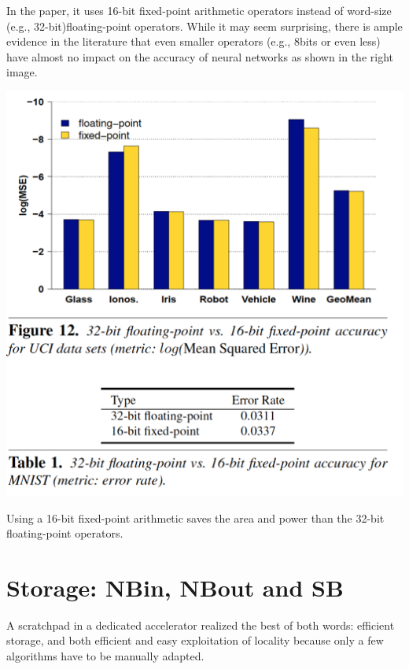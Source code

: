 \documentclass[10pt]{article}
\begin{document}
\begin{itemize}
        In the paper, it uses 16-bit fixed-point arithmetic
        operators instead of word-size (e.g., 32-bit)floating-point
        operators. While it may seem surprising, there is ample
        evidence in the literature that even smaller operators
        (e.g., 8bits or even less) have almost no impact on the 
        accuracy of neural networks as shown in the right image.
        \begin{marginfigure}
            \includegraphics[width=\marginparwidth]{arithmetic.png}
        \end{marginfigure}

        Using a 16-bit fixed-point arithmetic saves the area and
        power than the 32-bit floating-point operators.
    \end{itemize}
    \section{Storage: NBin, NBout and SB}
    A scratchpad in a dedicated accelerator realized the best of
    both words: efficient storage, and both efficient and easy
    exploitation of locality because only a few algorithms have to be
    manually adapted.
\end{document}
